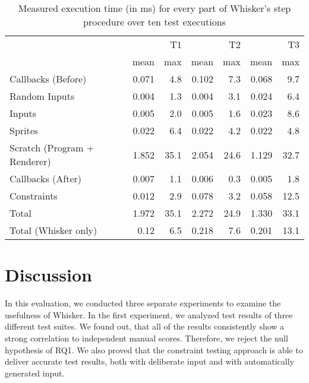 \begin{table}[htpb]
    \centering
    \footnotesize
    \begin{tabular}{l|rr|rr|rr}
        \toprule
                                     &       & T1   &       & T2   &       & T3   \\
                                     & mean  & max  & mean  & max  & mean  & max  \\
        \midrule
        Callbacks (Before)           & 0.071 & 4.8  & 0.102 & 7.3  & 0.068 & 9.7  \\
        Random Inputs                & 0.004 & 1.3  & 0.004 & 3.1  & 0.024 & 6.4  \\
        Inputs                       & 0.005 & 2.0  & 0.005 & 1.6  & 0.023 & 8.6  \\
        Sprites                      & 0.022 & 6.4  & 0.022 & 4.2  & 0.022 & 4.8  \\
        Scratch (Program + Renderer) & 1.852 & 35.1 & 2.054 & 24.6 & 1.129 & 32.7 \\
        Callbacks (After)            & 0.007 & 1.1  & 0.006 & 0.3  & 0.005 & 1.8  \\
        Constraints                  & 0.012 & 2.9  & 0.078 & 3.2  & 0.058 & 12.5 \\
        \midrule
        Total                        & 1.972 & 35.1 & 2.272 & 24.9 & 1.330 & 33.1 \\
        Total (Whisker only)         & 0.12  & 6.5  & 0.218 & 7.6  & 0.201 & 13.1 \\
        \bottomrule
    \end{tabular}
    \caption{Measured execution time (in ms) for every part of Whisker's step procedure over ten test executions}
    \label{tab:time_measurements}
\end{table}

\section{Discussion}
\label{sec:discussion}

In this evaluation, we conducted three separate experiments to examine the usefulness of Whisker.
In the first experiment, we analyzed test results of three different test suites.
We found out, that all of the results consistently show a strong correlation to independent manual scores.
Therefore, we reject the null hypothesis of RQ1.
We also proved that the constraint testing approach is able to deliver accurate test results,
both with deliberate input and with automatically generated input.
\parspace

